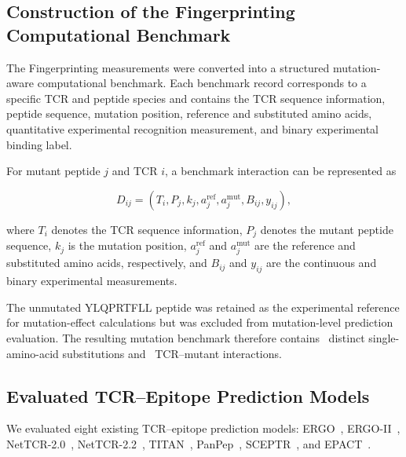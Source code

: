 \documentclass{article}
\begin{document}
\subsection{Construction of the Fingerprinting Computational Benchmark}

The Fingerprinting measurements were converted into a structured
mutation-aware computational benchmark. Each benchmark record corresponds to
a specific TCR and peptide species and contains the TCR sequence information,
peptide sequence, mutation position, reference and substituted amino acids,
quantitative experimental recognition measurement, and binary experimental
binding label.

For mutant peptide $j$ and TCR $i$, a benchmark interaction can be
represented as

\begin{equation}
D_{ij}
=
\left(
T_i,
P_j,
k_j,
a_j^{\mathrm{ref}},
a_j^{\mathrm{mut}},
B_{ij},
y_{ij}
\right),
\label{eq:benchmark_record}
\end{equation}

where $T_i$ denotes the TCR sequence information, $P_j$ denotes the mutant
peptide sequence, $k_j$ is the mutation position,
$a_j^{\mathrm{ref}}$ and $a_j^{\mathrm{mut}}$ are the reference and
substituted amino acids, respectively, and $B_{ij}$ and $y_{ij}$ are the
continuous and binary experimental measurements.

The unmutated YLQPRTFLL peptide was retained as the experimental reference
for mutation-effect calculations but was excluded from mutation-level
prediction evaluation. The resulting mutation benchmark therefore contains
\valNmutations\ distinct single-amino-acid substitutions and \valNpairs\ TCR--mutant
interactions.


\subsection{Evaluated TCR--Epitope Prediction Models}

We evaluated eight existing TCR--epitope prediction models:
ERGO~\cite{idospringerPredictionSpecificTCRPeptide2020},
ERGO-II~\cite{springer2021contribution},
NetTCR-2.0~\cite{montemurro2021nettcr},
NetTCR-2.2~\cite{mathiasfynbojensenEnhancingTCRSpecificity2024},
TITAN~\cite{annaweberTITANTcellReceptor2021},
PanPep~\cite{gao2023pan},
SCEPTR~\cite{nagano2024contrastive},
and EPACT~\cite{zhang2024epitope}.
\end{document}

